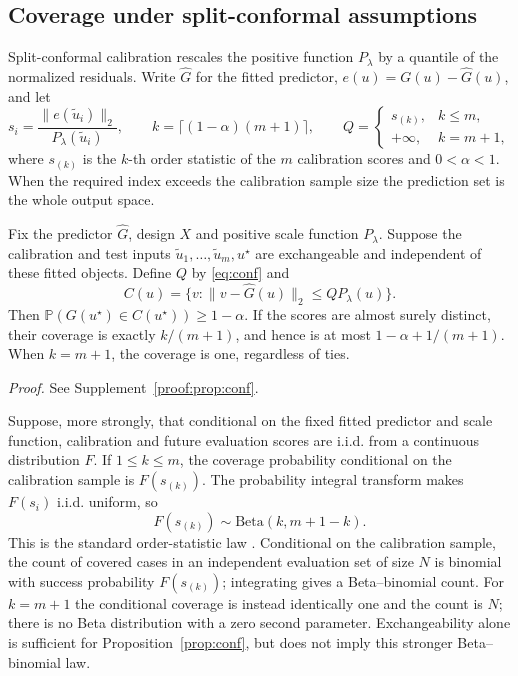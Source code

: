 \subsection{Coverage under split-conformal assumptions}

Split-conformal calibration rescales the positive function $P_\lambda$
by a quantile of the normalized residuals. Write $\widehat G$ for the fitted predictor,
$e(u)=G(u)-\widehat G(u)$, and let
\begin{equation}\label{eq:conf}
s_i=\frac{\|e(\tilde u_i)\|_2}{P_\lambda(\tilde u_i)},\qquad
k=\lceil(1-\alpha)(m+1)\rceil,\qquad
Q=\begin{cases}s_{(k)},&k\le m,\\+\infty,&k=m+1,\end{cases}
\end{equation}
where $s_{(k)}$ is the $k$-th order statistic of the $m$ calibration scores
and $0<\alpha<1$. When the required index exceeds the calibration sample
size the prediction set is the whole output space.

\begin{proposition}\label{prop:conf}
Fix the predictor $\widehat G$, design $X$ and positive scale function
$P_\lambda$. Suppose the calibration and test inputs
$\tilde u_1,\ldots,\tilde u_m,u^\star$ are exchangeable and independent of
these fitted objects. Define $Q$ by \eqref{eq:conf} and
\[
C(u)=\{v:\|v-\widehat G(u)\|_2\le QP_\lambda(u)\}.
\]
Then $\mathbb P(G(u^\star)\in C(u^\star))\ge1-\alpha$. If the scores
are almost surely distinct, their coverage is exactly $k/(m+1)$, and hence
is at most $1-\alpha+1/(m+1)$. When $k=m+1$, the coverage is one,
regardless of ties.
\end{proposition}
\noindent\emph{Proof.} See Supplement~\ref{proof:prop:conf}.


\begin{remark}\label{rem:covlaw}
Suppose, more strongly, that conditional on the fixed fitted predictor and
scale function, calibration and future evaluation scores are i.i.d. from a
continuous distribution $F$. If $1\le k\le m$, the coverage probability
conditional on the calibration sample is $F(s_{(k)})$. The probability
integral transform makes $F(s_i)$ i.i.d. uniform, so
\[
F(s_{(k)})\sim\mathrm{Beta}(k,m+1-k).
\]
This is the standard order-statistic law \citep{vovk2012conditional}.
Conditional on the calibration sample, the count of covered cases in an
independent evaluation set of size $N$ is binomial with success probability
$F(s_{(k)})$; integrating gives a Beta--binomial count. For $k=m+1$ the
conditional coverage is instead identically one and the count is $N$;
there is no Beta distribution with a zero second parameter. Exchangeability
alone is sufficient for Proposition~\ref{prop:conf}, but does not imply this
stronger Beta--binomial law.
\end{remark}

